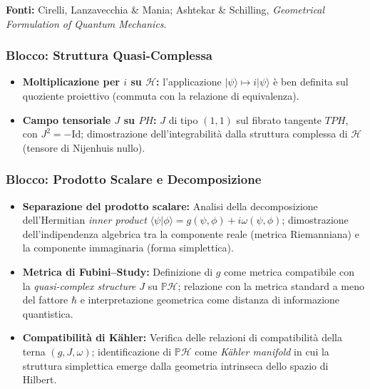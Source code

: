 \documentclass[12pt, a4paper]{article}
\newcommand{\fonti}[1]{%
	\begin{fontebox}
		\textcolor{fontecolor}{\footnotesize\textbf{Fonti:} #1}
	\end{fontebox}%
}
\begin{document}
	\fonti{Cirelli, Lanzavecchia \& Mania; Ashtekar \& Schilling, \textit{Geometrical Formulation of Quantum Mechanics}.}
	
	\subsubsection{Blocco: Struttura Quasi-Complessa}
	\begin{itemize}
		\item \textbf{Moltiplicazione per $i$ su $\mathcal{H}$:} l'applicazione $|\psi\rangle \mapsto i|\psi\rangle$ è ben definita sul quoziente proiettivo (commuta con la relazione di equivalenza).
		\item \textbf{Campo tensoriale $J$ su $PH$:} $J$ di tipo $(1,1)$ sul fibrato tangente $TPH$, con $J^2 = -\text{Id}$; dimostrazione dell'integrabilità dalla struttura complessa di $\mathcal{H}$ (tensore di Nijenhuis nullo).
	\end{itemize}
	
	\subsubsection{Blocco: Prodotto Scalare e Decomposizione}
	\begin{itemize}
		\item \textbf{Separazione del prodotto scalare:} Analisi della decomposizione dell'Hermitian \textit{inner product} $\langle\psi|\phi\rangle = g(\psi,\phi) + i\omega(\psi,\phi)$; dimostrazione dell'indipendenza algebrica tra la componente reale (metrica Riemanniana) e la componente immaginaria (forma simplettica).
		\item \textbf{Metrica di Fubini--Study:} Definizione di $g$ come metrica compatibile con la \textit{quasi-complex structure} $J$ su $\mathbb{P}\mathcal{H}$; relazione con la metrica standard a meno del fattore $\hbar$ e interpretazione geometrica come distanza di informazione quantistica.
		\item \textbf{Compatibilità di Kähler:} Verifica delle relazioni di compatibilità della terna $(g, J, \omega)$; identificazione di $\mathbb{P}\mathcal{H}$ come \textit{Kähler manifold} in cui la struttura simplettica emerge dalla geometria intrinseca dello spazio di Hilbert.
	\end{itemize}
	
\end{document}
